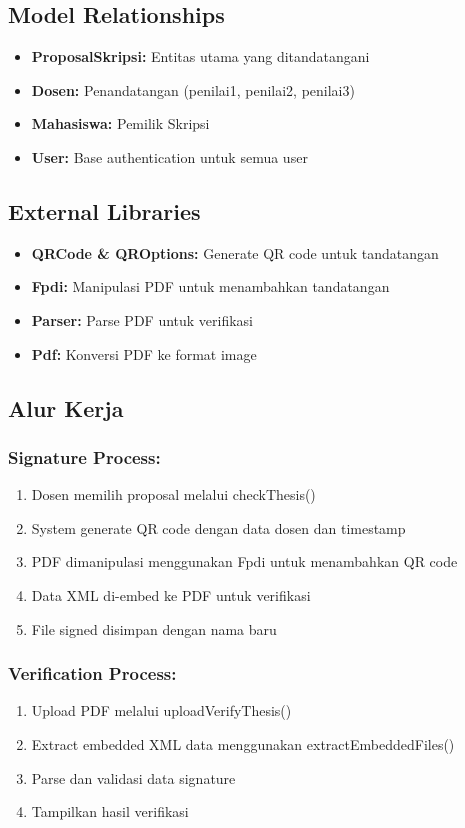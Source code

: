 \documentclass[11pt,a4paper]{article}
\begin{document}
\subsection{Model Relationships}
\begin{itemize}
    \item \textbf{ProposalSkripsi:} Entitas utama yang ditandatangani
    \item \textbf{Dosen:} Penandatangan (penilai1, penilai2, penilai3)
    \item \textbf{Mahasiswa:} Pemilik Skripsi
    \item \textbf{User:} Base authentication untuk semua user
\end{itemize}

\subsection{External Libraries}
\begin{itemize}
    \item \textbf{QRCode \& QROptions:} Generate QR code untuk tandatangan
    \item \textbf{Fpdi:} Manipulasi PDF untuk menambahkan tandatangan
    \item \textbf{Parser:} Parse PDF untuk verifikasi
    \item \textbf{Pdf:} Konversi PDF ke format image
\end{itemize}

\subsection{Alur Kerja}
\subsubsection{Signature Process:}
\begin{enumerate}
    \item Dosen memilih proposal melalui checkThesis()
    \item System generate QR code dengan data dosen dan timestamp
    \item PDF dimanipulasi menggunakan Fpdi untuk menambahkan QR code
    \item Data XML di-embed ke PDF untuk verifikasi
    \item File signed disimpan dengan nama baru
\end{enumerate}

\subsubsection{Verification Process:}
\begin{enumerate}
    \item Upload PDF melalui uploadVerifyThesis()
    \item Extract embedded XML data menggunakan extractEmbeddedFiles()
    \item Parse dan validasi data signature
    \item Tampilkan hasil verifikasi
\end{enumerate}
\end{document}
